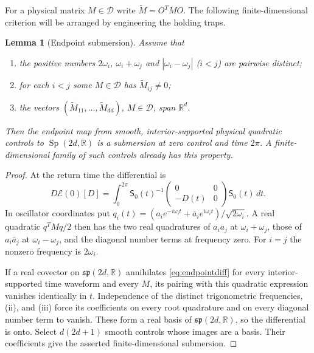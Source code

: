 \documentclass[11pt]{article}
\numberwithin{equation}{section}
\newtheorem{lemma}[lemma]{Lemma}
\theoremstyle{definition}
\newcommand{\R}{\mathbb R}
\newcommand{\Sp}{\operatorname{Sp}}
\newcommand{\calD}{\mathcal D}
\begin{document}
For a physical matrix $M\in\calD$ write $\widetilde M=O^TMO$.
The following finite-dimensional criterion will be arranged by
engineering the holding traps.

\begin{lemma}[Endpoint submersion]\label{lem:submersion}
Assume that
\begin{enumerate}[label=(\roman*)]
 \item the positive numbers $2\omega_i$, $\omega_i+\omega_j$ and
 $|\omega_i-\omega_j|$ ($i<j$) are pairwise distinct;
 \item for each $i<j$ some $M\in\calD$ has
 $\widetilde M_{ij}\ne0$;
 \item the vectors $(\widetilde M_{11},\ldots,\widetilde M_{dd})$,
 $M\in\calD$, span $\R^d$.
\end{enumerate}
Then the endpoint map from smooth, interior-supported physical
quadratic controls to $\Sp(2d,\R)$ is a submersion at zero control
and time $2\pi$. A finite-dimensional family of such controls
already has this property.
\end{lemma}

\begin{proof}
At the return time the differential is
\begin{equation}\label{eq:endpointdiff}
 D\mathcal E(0)[D]=\int_0^{2\pi}
 \mathsf S_0(t)^{-1}
 \begin{pmatrix}0&0\\-D(t)&0\end{pmatrix}
 \mathsf S_0(t)\,dt .
\end{equation}
In oscillator coordinates put
$q_i(t)=(a_i e^{-i\omega_i t}+\bar a_i e^{i\omega_i t})/
\sqrt{2\omega_i}$. A real quadratic $q^TMq/2$ then has the
two real quadratures of $a_ia_j$ at $\omega_i+\omega_j$, those of
$a_i\bar a_j$ at $\omega_i-\omega_j$, and the diagonal
number terms at frequency zero. For $i=j$ the nonzero frequency
is $2\omega_i$.

If a real covector on $\mathfrak{sp}(2d,\R)$ annihilates
\eqref{eq:endpointdiff} for every interior-supported time waveform
and every $M$, its pairing with this quadratic expression vanishes
identically in $t$. Independence of the distinct trigonometric
frequencies, (ii), and (iii) force its coefficients on every root
quadrature and on every diagonal number term to vanish.
These form a real basis of $\mathfrak{sp}(2d,\R)$, so the
differential is onto. Select $d(2d+1)$ smooth controls whose
images are a basis. Their coefficients give the asserted
finite-dimensional submersion.
\end{proof}
\end{document}
